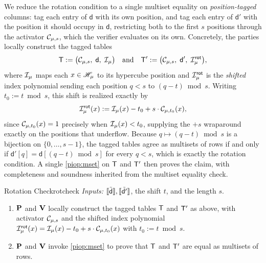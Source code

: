 We reduce the rotation condition to a single multiset equality on \emph{position-tagged} columns: tag each entry of $\mathsf{d}$ with its own position, and tag each entry of $\mathsf{d}'$ with the position it should occupy in $\mathsf{d}$, restricting both to the first $s$ positions through the activator $\mathcal{C}_{\mu,s}$, which the verifier evaluates on its own. Concretely, the parties locally construct the tagged tables
\begin{displaymath}
  \mathsf{T} := \bigl(\mathcal{C}_{\mu,s},\; \mathsf{d},\; \mathcal{I}_\mu\bigr)
  \quad\text{and}\quad
  \mathsf{T}' := \bigl(\mathcal{C}_{\mu,s},\; \mathsf{d}',\; \mathcal{I}^{\mathsf{rot}}_\mu\bigr),
\end{displaymath}
where $\mathcal{I}_\mu$ maps each $x \in \mathscr{H}_{\mu}$ to its hypercube position and $\mathcal{I}^{\mathsf{rot}}_\mu$ is the \emph{shifted} index polynomial sending each position $q < s$ to $(q - t) \bmod s$. Writing $t_0 := t \bmod s$, this shift is realized exactly by
\begin{displaymath}
  \mathcal{I}^{\mathsf{rot}}_\mu(x) := \mathcal{I}_\mu(x) - t_0 + s\cdot\mathcal{C}_{\mu, t_0}(x),
\end{displaymath}
since $\mathcal{C}_{\mu, t_0}(x) = 1$ precisely when $\mathcal{I}_\mu(x) < t_0$, supplying the $+s$ wraparound exactly on the positions that underflow. Because $q \mapsto (q - t) \bmod s$ is a bijection on $\{0, \ldots, s-1\}$, the tagged tables agree as multisets of rows if and only if $\mathsf{d}'[q] = \mathsf{d}[(q-t) \bmod s]$ for every $q < s$, which is exactly the rotation condition. A single \cref{piop:mset} on $\mathsf{T}$ and $\mathsf{T}'$ then proves the claim, with completeness and soundness inherited from the multiset equality check.
\begin{DefinePIOP}{Rotation Check}{rotcheck}
  \emph{Inputs:} $\llbracket\tilde{\mathsf{d}}\rrbracket, \llbracket\tilde{\mathsf{d}'}\rrbracket$, the shift $t$, and the length $s$.
  \begin{enumerate}[nosep]
    \item $\bf{P}$ and $\bf{V}$ locally construct the tagged tables $\mathsf{T}$ and $\mathsf{T}'$ as above, with activator $\mathcal{C}_{\mu,s}$ and the shifted index polynomial $\mathcal{I}^{\mathsf{rot}}_\mu(x) = \mathcal{I}_\mu(x) - t_0 + s\cdot\mathcal{C}_{\mu, t_0}(x)$ with $t_0 := t \bmod s$.
    \item $\bf{P}$ and $\bf{V}$ invoke \cref{piop:mset} to prove that $\mathsf{T}$ and $\mathsf{T}'$ are equal as multisets of rows.
  \end{enumerate}
\end{DefinePIOP}


